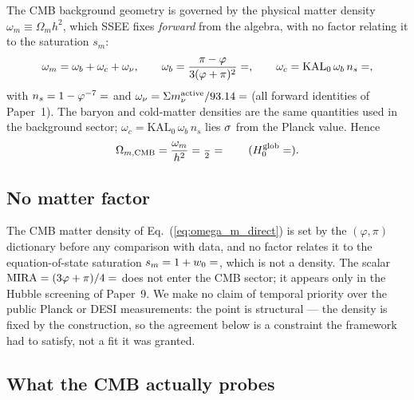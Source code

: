 \documentclass[12pt,a4paper]{article}
\begin{document}
The CMB background geometry is governed by the physical matter density
$\omega_m\equiv\Omega_m h^2$, which SSEE fixes \emph{forward} from the algebra,
with no factor relating it to the saturation $s_m$:
\begin{equation}
  \omega_m = \omega_b + \omega_c + \omega_\nu, \qquad
  \omega_b = \frac{\pi-\varphi}{3(\varphi+\pi)^2} = \val{OMEGA_B_H2_d6}, \qquad
  \omega_c = \mathrm{KAL}_0\,\omega_b\,n_s = \val{OMEGA_C_H2_d6},
  \label{eq:omega_m_direct}
\end{equation}
with $n_s=1-\varphi^{-7}=\val{N_S_d6}$ and $\omega_\nu=\Sigma m_\nu^{\rm active}/93.14=\val{OMEGA_NU_H2_d6}$
(all forward identities of Paper~1). The baryon and cold-matter densities are the same
quantities used in the background sector; $\omega_c=\mathrm{KAL}_0\,\omega_b\,n_s$ lies
$\val{wc_ns_sigma_abs}\sigma$ from the Planck value. Hence
\begin{equation}
  \Omega_{m,\mathrm{CMB}} = \frac{\omega_m}{h^2} = \frac{\val{OMEGA_M_H2_d5}}{\val{h_glob_d4}^2} = \val{OMEGA_M_TOTAL_d4}
  \qquad (H_0^{\rm glob} = \val{H0_GLOBAL_d5}).
\end{equation}

\subsection{No matter factor}
\label{sec:mira_timeline}

The CMB matter density of Eq.~(\ref{eq:omega_m_direct}) is set by the
$(\varphi,\pi)$ dictionary before any comparison with data, and no factor
relates it to the equation-of-state saturation $s_m=1+w_0=\val{S_M_d6}$, which is
not a density. The scalar $\mathrm{MIRA}=(3\varphi+\pi)/4=\val{MIRA_d4}$ does not enter
the CMB sector; it appears only in the Hubble screening of Paper~9. We make no
claim of temporal priority over the public Planck or DESI measurements: the
point is structural --- the density is fixed by the construction, so the
agreement below is a constraint the framework had to satisfy, not a fit it was
granted.

\subsection{What the CMB actually probes}
\end{document}
